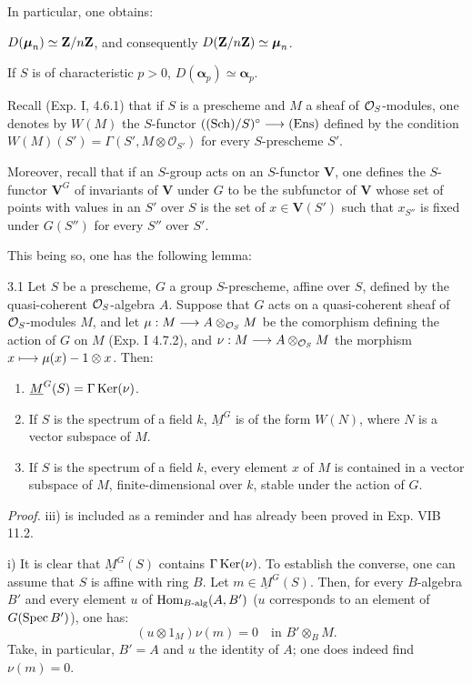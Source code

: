 In particular, one obtains:
\begin{enumeratei}
\item $D(\boldsymbol\mu_n)\simeq\mathbf{Z}/n\mathbf{Z}$, and consequently $D(\mathbf{Z}/n\mathbf{Z})\simeq\boldsymbol\mu_n$.
\item If $S$ is of characteristic $p>0$, $D(\boldsymbol\alpha_p)\simeq\boldsymbol\alpha_p$.
\end{enumeratei}

Recall (Exp. I, 4.6.1) that if $S$ is a prescheme and $M$ a sheaf of $\mathcal{O}_S$-modules, one denotes by $W(M)$ the $S$-functor $(\textup{(Sch)}/S)^\circ\longrightarrow\textup{(Ens)}$ defined by the condition $W(M)(S')=\Gamma(S',M\otimes\mathcal O_{S'})$ for every $S$-prescheme $S'$.

Moreover, recall that if an $S$-group acts on an $S$-functor $\mathbf V$, one defines the $S$-functor $\mathbf V^G$ of invariants of $\mathbf V$ under $G$ to be the subfunctor of $\mathbf V$ whose set of points with values in an $S'$ over $S$ is the set of $x\in\mathbf V(S')$ such that $x_{S''}$ is fixed under $G(S'')$ for every $S''$ over $S'$.

This being so, one has the following lemma:
\begin{lemma}{3.1}\label{XVII.3.1}
Let $S$ be a prescheme, $G$ a group $S$-prescheme, affine over $S$, defined by the quasi-coherent $\mathcal{O}_S$-algebra $A$. Suppose that $G$ acts on a quasi-coherent sheaf of $\mathcal{O}_S$-modules $M$, and let $\mu:M\longrightarrow A\otimes_{\mathcal{O}_S}M$ be the comorphism defining the action of $G$ on $M$ (Exp. I 4.7.2), and $\nu:M\longrightarrow A\otimes_{\mathcal{O}_S}M$ the morphism $x\longmapsto\mu(x)-1\otimes x$. Then:
\begin{enumerate}[label=\textup{\roman*)}]
\item $\underline M^G(S)=\Gamma\operatorname{Ker}(\nu)$.
\item If $S$ is the spectrum of a field $k$, $\underline M^G$ is of the form $W(N)$, where $N$ is a vector subspace of $M$.
\item If $S$ is the spectrum of a field $k$, every element $x$ of $M$ is contained in a vector subspace of $M$, finite-dimensional over $k$, stable under the action of $G$.
\end{enumerate}
\end{lemma}
\noindent\emph{Proof.} iii) is included as a reminder and has already been proved in Exp. VIB 11.2.

\noindent i) It is clear that $\underline M^G(S)$ contains $\Gamma\operatorname{Ker}(\nu)$. To establish the converse, one can assume that $S$ is affine with ring $B$. Let $m\in\underline M^G(S)$. Then, for every $B$-algebra $B'$ and every element $u$ of $\operatorname{Hom}_{B\text{-alg}}(A,B')$ ($u$ corresponds to an element of $G(\operatorname{Spec} B')$), one has:
\[
 (u\otimes1_M)\nu(m)=0\quad\text{in }B'\otimes_B M.
\]
Take, in particular, $B'=A$ and $u$ the identity of $A$; one does indeed find $\nu(m)=0$.

